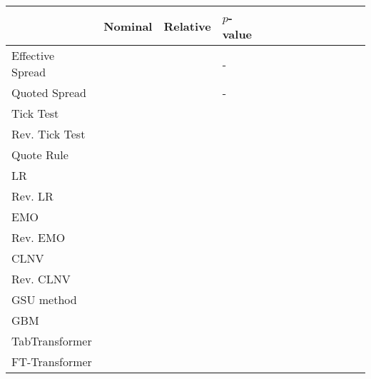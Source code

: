 \begin{tabular}{lllllllllllll}
    \toprule
                     & Nominal & Relative & $p$-value \\ \midrule
    Effective Spread &         &          & -         \\
    Quoted Spread    &         &          & -         \\ \midrule
    Tick Test        &         &          &           \\
    Rev. Tick Test   &         &          &           \\
    Quote Rule       &         &          &           \\
    \gls{LR}         &         &          &           \\
    Rev. \gls{LR}    &         &          &           \\
    \gls{EMO}        &         &          &           \\
    Rev. \gls{EMO}   &         &          &           \\
    \gls{CLNV}       &         &          &           \\
    Rev. \gls{CLNV}  &         &          &           \\
    \gls{GSU} method &         &          &           \\ \midrule
    \gls{GBM}        &         &          &           \\ \midrule
    TabTransformer   &         &          &           \\
    FT-Transformer   &         &          &           \\ \bottomrule
\end{tabular}